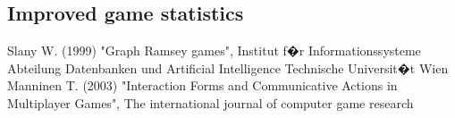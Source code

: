 \subsection{Improved game statistics}







\newpage


\begin{thebibliography}{10}
 Slany W. (1999) "Graph Ramsey games", Institut
f�r Informationssysteme Abteilung Datenbanken und Artificial Intelligence Technische
Universit�t Wien
 Manninen T. (2003) "Interaction Forms and Communicative
Actions in Multiplayer Games",  The international journal of computer game
research

\end{thebibliography}


